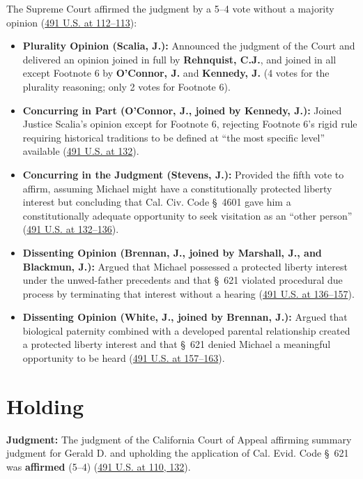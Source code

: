 \documentclass[12pt]{article}
\begin{document}
The Supreme Court affirmed the judgment by a 5--4 vote without a majority opinion (\href{https://supreme.justia.com/cases/federal/us/491/110/}{491 U.S. at 112--113}):
\begin{itemize}
\item \textbf{Plurality Opinion (Scalia, J.):} Announced the judgment of the Court and delivered an opinion joined in full by \textbf{Rehnquist, C.J.}, and joined in all except Footnote 6 by \textbf{O'Connor, J.} and \textbf{Kennedy, J.} (4 votes for the plurality reasoning; only 2 votes for Footnote 6).
\item \textbf{Concurring in Part (O'Connor, J., joined by Kennedy, J.):} Joined Justice Scalia's opinion except for Footnote 6, rejecting Footnote 6's rigid rule requiring historical traditions to be defined at ``the most specific level'' available (\href{https://supreme.justia.com/cases/federal/us/491/110/}{491 U.S. at 132}).
\item \textbf{Concurring in the Judgment (Stevens, J.):} Provided the fifth vote to affirm, assuming Michael might have a constitutionally protected liberty interest but concluding that Cal. Civ. Code \S~4601 gave him a constitutionally adequate opportunity to seek visitation as an ``other person'' (\href{https://supreme.justia.com/cases/federal/us/491/110/}{491 U.S. at 132--136}).
\item \textbf{Dissenting Opinion (Brennan, J., joined by Marshall, J., and Blackmun, J.):} Argued that Michael possessed a protected liberty interest under the unwed-father precedents and that \S~621 violated procedural due process by terminating that interest without a hearing (\href{https://supreme.justia.com/cases/federal/us/491/110/}{491 U.S. at 136--157}).
\item \textbf{Dissenting Opinion (White, J., joined by Brennan, J.):} Argued that biological paternity combined with a developed parental relationship created a protected liberty interest and that \S~621 denied Michael a meaningful opportunity to be heard (\href{https://supreme.justia.com/cases/federal/us/491/110/}{491 U.S. at 157--163}).
\end{itemize}

\section{Holding}

\textbf{Judgment:} The judgment of the California Court of Appeal affirming summary judgment for Gerald D. and upholding the application of Cal. Evid. Code \S~621 was \textbf{affirmed} (5--4) (\href{https://supreme.justia.com/cases/federal/us/491/110/}{491 U.S. at 110, 132}).
\end{document}
